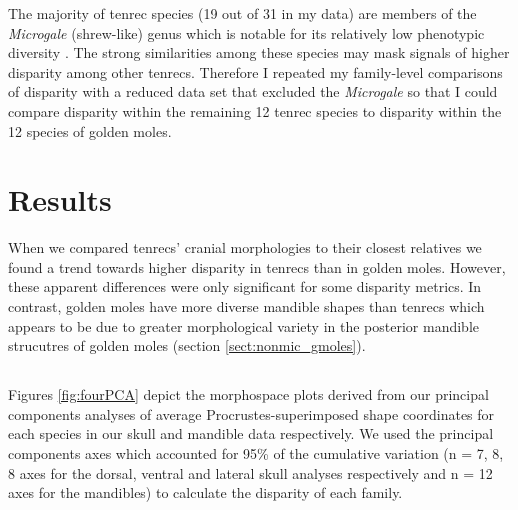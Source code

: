 	The majority of tenrec species (19 out of 31 in my data) are members of the \textit{Microgale} (shrew-like) genus which is notable for its relatively low phenotypic diversity \citep{ Soarimalala2011, Jenkins2003}. The strong similarities among these species may mask signals of higher disparity among other tenrecs. Therefore I repeated my family-level comparisons of disparity with a reduced data set that excluded the \textit{Microgale} so that I could compare disparity within the remaining 12 tenrec species to disparity within the 12 species of golden moles.

\section{Results} %

	When we compared tenrecs’ cranial morphologies to their closest relatives we found a trend towards higher disparity in tenrecs than
	in golden moles. However, these apparent differences were only
	significant for some disparity metrics. In contrast, golden moles have more diverse mandible shapes than tenrecs which appears to be due to greater morphological variety in the posterior mandible strucutres of golden moles (section \ref{sect:nonmic_gmoles}).

\subsection{}
	Figures  \ref{fig:fourPCA} depict the morphospace plots derived from our principal components analyses of average Procrustes-superimposed shape coordinates for each species in our skull and mandible data respectively. We used the principal components axes which accounted for 95\% of the cumulative variation (n = 7, 8, 8 axes for the dorsal, ventral and lateral skull analyses respectively and n = 12 axes for the mandibles) to calculate the disparity of each family. 

